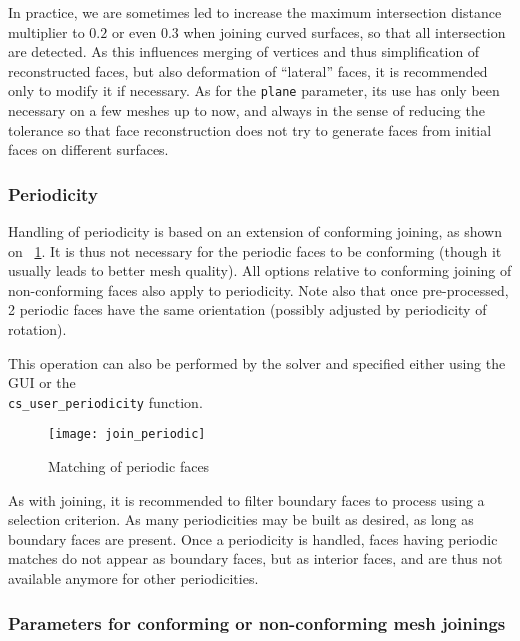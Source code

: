 {{{{In practice, we are sometimes led to increase the maximum intersection
distance multiplier to $0.2$ or even $0.3$ when joining curved surfaces,
so that all intersection are detected. As this influences merging
of vertices and thus simplification of reconstructed faces, but also
deformation of ``lateral'' faces, it is recommended only to modify it
if necessary. As for the \texttt{plane} parameter, its use has
only been necessary on a few meshes up to now, and always in the
sense of reducing the tolerance so that face reconstruction does not
try to generate faces from initial faces on different surfaces.

\subsubsection{Periodicity\label{sec:optpcs:period}}

Handling of periodicity is based on an extension of conforming joining,
as shown on \figurename~\ref{fig:join_periodic}. It is thus not necessary
for the periodic faces to be conforming (though it usually leads to better
mesh quality). All options relative to conforming joining of
non-conforming faces also apply to periodicity. Note also that
once pre-processed, 2 periodic faces have the same orientation
(possibly adjusted by periodicity of rotation).

This operation can also be performed by the solver and specified
either using the GUI or the \\\texttt{cs\_user\_periodicity} function.

\begin{figure}[!hp]
\centerline{
\texttt{[image: join\_periodic]}}
\caption{Matching of periodic faces
\label{fig:join_periodic}}
\end{figure}

As with joining, it is recommended to filter boundary faces to process
using a selection criterion. As many periodicities may be built as desired,
as long as boundary faces are present. Once a periodicity is handled,
faces having periodic matches do not appear as boundary faces, but as
interior faces, and are thus not available anymore for other
periodicities.

\subsubsection{Parameters for conforming or non-conforming mesh joinings}

}}}}

